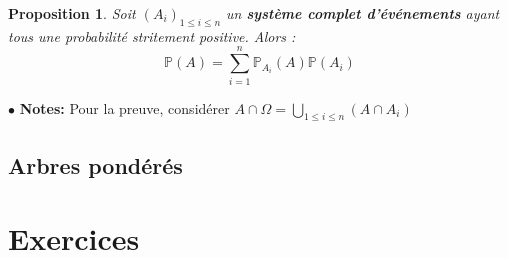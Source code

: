 \documentclass[a4paper]{report}
\theoremstyle{break}
\newtheorem{prop}{Proposition}[chapter]
\newcommand{\p}{\mathbb{P}}
\newcommand{\note}{$\bullet$ \textbf{Notes: }}
\begin{document}
\begin{prop}
  Soit $(A_i)_{1\leq i \leq n}$ un \textbf{système complet
    d'événements} ayant tous une probabilité stritement
  positive. Alors :
  \[
    \p(A) = \sum \limits_{i=1}^n \p_{A_i}(A)\p(A_i)
  \]
\end{prop}

\note Pour la preuve, considérer $A \cap \Omega = \bigcup \limits_{1
  \leq i \leq n} (A \cap A_i)$

\subsection{Arbres pondérés}

\section{Exercices}


\end{document}
